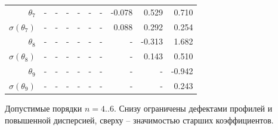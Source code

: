 \documentclass{matmex-diploma-custom}
\begin{document}
\begin{table}[h!!]
\begin{tabular}{r|rrr|rrr|rrr}
 $\theta_7$&-     &    - &    - &    - &    - &    - &  -0.078 &   0.529 &   0.710 \\
 $ \sigma(\theta_7)$&-     &    - &    - &    - &    - &    - &      0.088 &   0.292 &   0.254 \\
 $\theta_8$&-     &    - &    - &    - &    - &    - &    - &   -0.313 &   1.682 \\
 $ \sigma(\theta_8)$&-     &    - &    - &    - &    - &    - &    - &     0.143 &   0.510 \\
 $\theta_9$&-     &    - &    - &    - &    - &    - &    - &    - &  -0.942  \\
 $ \sigma(\theta_9)$&-     &    - &    - &    - &    - &    - &    - &    - &   0.243  \\
\end{tabular}
\end{table}
Допустимые порядки $n=4..6$. Снизу ограничены дефектами профилей и повышенной дисперсией, сверху -- значимостью старших коэффициентов.
\end{document}
